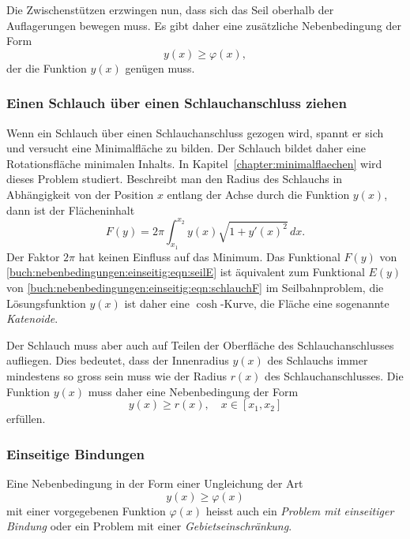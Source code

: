 Die Zwischenstützen erzwingen nun, dass sich das Seil oberhalb der 
Auflagerungen bewegen muss.
Es gibt daher eine zusätzliche Nebenbedingung der Form
\[
y(x) \ge \varphi(x),
\]
der die Funktion $y(x)$ genügen muss.

%
%
\subsubsection{Einen Schlauch über einen Schlauchanschluss ziehen}
Wenn ein Schlauch über einen Schlauchanschluss gezogen wird, spannt
%
%
er sich und versucht eine Minimalfläche zu bilden.
%
Der Schlauch bildet daher eine Rotationsfläche minimalen Inhalts.
%
In Kapitel~\ref{chapter:minimalflaechen} wird dieses Problem 
studiert.
Beschreibt man den Radius des Schlauchs in Abhängigkeit von der
Position $x$ entlang der Achse durch die Funktion $y(x)$, dann ist
der Flächeninhalt
\begin{equation}
F(y)
=
2\pi
\int_{x_1}^{x_2}
y(x)\sqrt{1+y'(x)^2}\,dx.
\label{buch:nebenbedingungen:einseitig:eqn:schlauchF}
\end{equation}
Der Faktor $2\pi$ hat keinen Einfluss auf das Minimum.
Das Funktional $F(y)$ von
\eqref{buch:nebenbedingungen:einseitig:eqn:seilE}
ist äquivalent zum Funktional $E(y)$ von
\eqref{buch:nebenbedingungen:einseitig:eqn:schlauchF}
im Seilbahnproblem,
die Lösungsfunktion $y(x)$ ist daher eine $\cosh$-Kurve,
die Fläche eine sogenannte {\em Katenoide}.

Der Schlauch muss aber auch auf Teilen der Oberfläche des
Schlauchanschlusses aufliegen.
Dies bedeutet, dass der Innenradius $y(x)$ des Schlauchs immer
mindestens so gross sein muss wie der Radius $r(x)$ des Schlauchanschlusses.
Die Funktion $y(x)$ muss daher eine Nebenbedingung der Form
\[
y(x) \ge r(x),\quad x\in[x_1,x_2]
\]
erfüllen.

%
%
\subsubsection{Einseitige Bindungen}
Eine Nebenbedingung in der Form einer Ungleichung der Art
\[
y(x) \ge \varphi(x)
\]
mit einer vorgegebenen Funktion $\varphi(x)$ heisst auch
ein {\em Problem mit einseitiger Bindung}
%
%
oder ein Problem mit einer {\em Gebietseinschränkung}.
%


